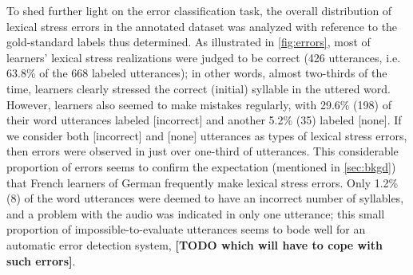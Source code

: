 \documentclass[a4paper]{article}
\newcommand{\TODO}[1]{{\color{red}\textbf{[TODO #1]}}}
\begin{document}
		
		To shed further light on the error classification task, the overall distribution of lexical stress errors in the annotated dataset 
		was analyzed with reference to the gold-standard labels thus determined.
		As 
		illustrated in \cref{fig:errors}, 
		most of learners' lexical stress realizations were judged to be correct (426 utterances, i.e. 63.8\% of the 668 labeled utterances);
		in other words, almost two-thirds of the time, learners clearly stressed the correct (initial) syllable in the uttered word.
		However, learners also seemed to make mistakes regularly, with 29.6\% (198) of their word utterances labeled [incorrect] and another 5.2\% (35) labeled [none].
		If we consider both [incorrect] and [none] utterances as types of lexical stress errors, then errors were observed in just over one-third of utterances. %
		This considerable proportion of errors seems to confirm the expectation (mentioned in \cref{sec:bkgd}) that French learners of German frequently make lexical stress errors.
		Only 1.2\% (8) of the word utterances were deemed to have an incorrect number of syllables, and a problem with the audio was indicated in only one utterance; this small proportion of impossible-to-evaluate utterances seems to bode well for an automatic error detection system, \TODO{which will have to cope with such errors}.
		
		
\end{document}
